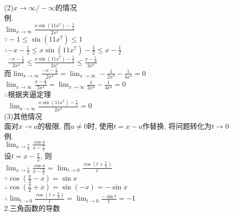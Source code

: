 (2)$x\to\infty/-\infty$的情况\\
例.\\
\phantom{例}$\displaystyle\lim_{x\to\infty}\frac{x\sin(11x^7)-\frac{1}{2}}{2x^4}$\\
$\displaystyle\because-1\leqslant\sin(11x^7)\leqslant1$\\
$\displaystyle\therefore-x-\frac{1}{2}\leqslant x\sin(11x^7)-\frac{1}{2}\leqslant x-\frac{1}{2}$\\
$\displaystyle\phantom{\therefore}\frac{-x-\frac{1}{2}}{2x^4}\leqslant\frac{x\sin(11x^7)-\frac{1}{2}}{2x^4}\leqslant\frac{x-\frac{1}{2}}{2x^4}$\\
而$\displaystyle\lim_{x\to\infty}\frac{-x-\frac{1}{2}}{2x^4}=\lim_{x\to\infty}-\frac{1}{2x^3}-\frac{1}{4x^4}=0$\\
\phantom{而}$\displaystyle\lim_{x\to\infty}\frac{x-\frac{1}{2}}{2x^4}=\lim_{x\to\infty}\frac{1}{2x^3}-\frac{1}{4x^4}=0$\\
$\displaystyle\therefore$根据夹逼定理\\
$\displaystyle\phantom{\therefore}\lim_{x\to\infty}\frac{x\sin(11x^7)-\frac{1}{2}}{2x^4}=0$\\[2ex]

(3)其他情况\\
面对$x\to a$的极限, 而$a\neq 0$时, 使用$t=x-a$作替换, 将问题转化为$t\to 0$\\
例.\\
\phantom{例}$\displaystyle\lim_{x\to\frac{\pi}{2}}\frac{\cos x}{x-\frac{\pi}{2}}$\\
设$t=x-\frac{\pi}{2}$, 则\\
$\displaystyle\lim_{x\to\frac{\pi}{2}}\frac{\cos x}{x-\frac{\pi}{2}}=\lim_{t\to 0}\frac{\cos(t+\frac{\pi}{2})}{t}$\\
$\displaystyle\because\cos(\frac{\pi}{2}-x)=\sin x$\\
$\displaystyle\therefore\cos(\frac{\pi}{2}+x)=\sin(-x)=-\sin x$\\
$\displaystyle\therefore\lim_{t\to 0}\frac{\cos(t+\frac{\pi}{2})}{t}=\lim_{t\to 0}\frac{-\sin t}{t}=-1$\\[2ex]

2.三角函数的导数\\[2ex]
\\[2ex]
\\[2ex]
\\[2ex]
\\[2ex]
\\[2ex]
\\[2ex]

